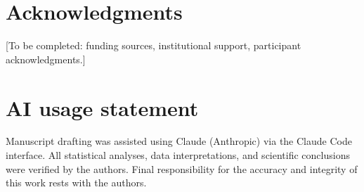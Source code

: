 \section*{Acknowledgments}
[To be completed: funding sources, institutional support, participant
acknowledgments.]

\section*{AI usage statement}
Manuscript drafting was assisted using Claude (Anthropic) via the Claude Code
interface.
All statistical analyses, data interpretations, and scientific conclusions were
verified by the authors.
Final responsibility for the accuracy and integrity of this work rests with
the authors.

